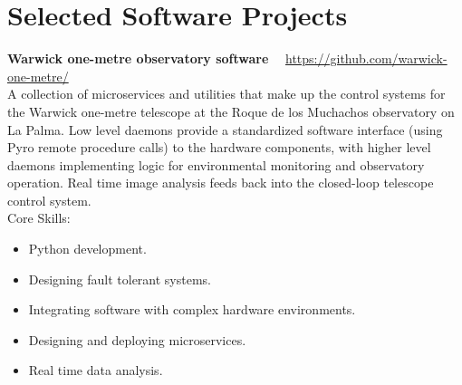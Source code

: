 \documentclass[print]{cv-style}
\begin{document}
\section{Selected Software Projects}

\parbox[t]{12.8cm}{%
    \textbf{Warwick one-metre observatory software}%
    \hfill%
    {\footnotesize\color{lightgray} \faGithub~~\url{https://github.com/warwick-one-metre/}}\\%
    A collection of microservices and utilities that make up the control systems for the Warwick one-metre telescope at the Roque de los Muchachos observatory on La Palma.  Low level daemons provide a standardized software interface (using Pyro remote procedure calls) to the hardware components, with higher level daemons implementing logic for environmental monitoring and observatory operation.  Real time image analysis feeds back into the closed-loop telescope control system.
    \vspace{\parsep}\\
    Core Skills:
    \begin{itemize}
      \item Python development.
      \item Designing fault tolerant systems.
      \item Integrating software with complex hardware environments.
      \item Designing and deploying microservices.
      \item Real time data analysis.
    \end{itemize}
}

\end{document}
